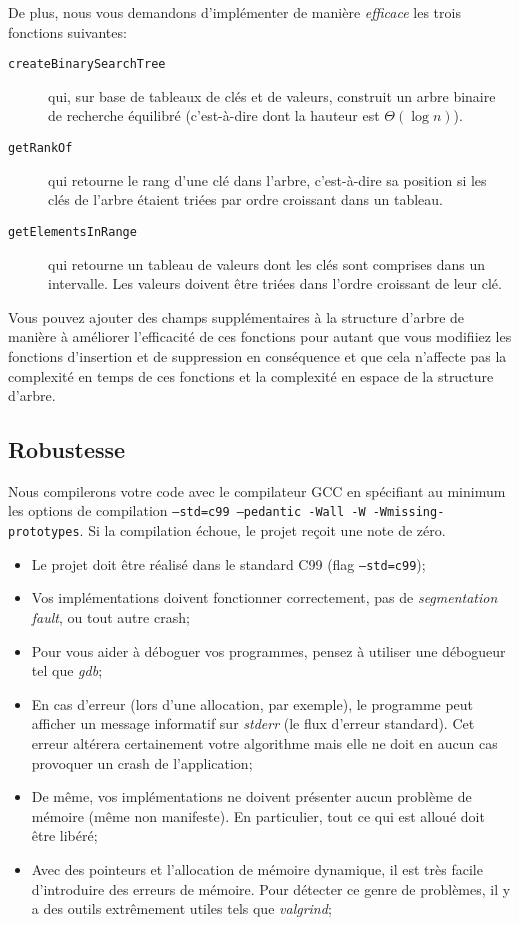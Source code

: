 \documentclass[a4paper,10pt]{article}
\begin{document}
De plus, nous vous demandons d'implémenter de manière {\em efficace} les trois fonctions suivantes:
\begin{description}
\item[\texttt{createBinarySearchTree}] qui, sur base de tableaux
  de clés et de valeurs, construit un arbre binaire de recherche
  équilibré (c'est-à-dire dont la hauteur est $\Theta(\log n)$).
\item[\texttt{getRankOf}] qui retourne le rang d'une clé dans l'arbre,
  c'est-à-dire sa position si les clés de l'arbre étaient triées par
  ordre croissant dans un tableau.
\item[\texttt{getElementsInRange}] qui retourne un tableau de valeurs
  dont les clés sont comprises dans un intervalle. Les valeurs doivent
  être triées dans l'ordre croissant de leur clé.
\end{description}
Vous pouvez ajouter des champs supplémentaires à la structure d'arbre
de manière à améliorer l'efficacité de ces fonctions pour autant que
vous modifiiez les fonctions d'insertion et de suppression en
conséquence et que cela n'affecte pas la complexité en temps de ces
fonctions et la complexité en espace de la structure d'arbre.

\subsection*{Robustesse}

Nous compilerons votre code avec le compilateur GCC en spécifiant au
minimum les options de compilation \texttt{--std=c99 --pedantic -Wall -W -Wmissing-
prototypes}. Si la compilation échoue, le projet reçoit une note de zéro.

\begin{itemize}
\item Le projet doit être réalisé dans le standard C99 (flag
  \texttt{--std=c99});
\item Vos implémentations doivent fonctionner correctement, pas de
  {\em segmentation fault}, ou tout autre crash;
\item Pour vous aider à déboguer vos programmes, pensez à utiliser une
  débogueur tel que {\em gdb};
\item En cas d'erreur (lors d'une allocation, par exemple), le
  programme peut afficher un message informatif sur {\em stderr} (le
  flux d'erreur standard). Cet erreur altérera certainement votre
  algorithme mais elle ne doit en aucun cas provoquer un crash de
  l'application;
\item De même, vos implémentations ne doivent présenter aucun problème
  de mémoire (même non manifeste). En particulier, tout ce qui est
  alloué doit être libéré;
\item Avec des pointeurs et l’allocation de mémoire dynamique, il est
  très facile d’introduire des erreurs de mémoire. Pour détecter ce
  genre de problèmes, il y a des outils extrêmement utiles tels que
  {\em valgrind};
\end{itemize}
\end{document}
